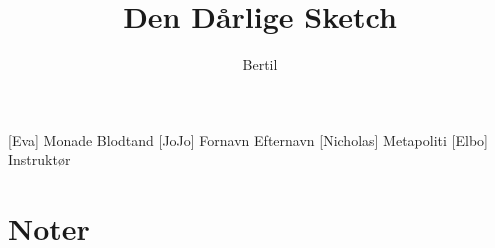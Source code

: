 \documentclass[a4paper,11pt]{article}
\title{Den Dårlige Sketch}
\author{Bertil}
\begin{document}
\maketitle

\begin{roles}
[Eva] Monade Blodtand
[JoJo] Fornavn Efternavn
[Nicholas] Metapoliti
[Elbo] Instruktør
\end{roles} 

\section*{Noter}




\begin{props}
\end{props}
\end{document}
